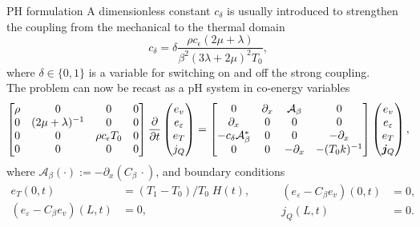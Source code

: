 \documentclass[aspectratio=169]{ISAE-Beamer}
\begin{document}
\begin{frame}{PH formulation}
A dimensionless constant $c_\delta$ is usually introduced to strengthen the coupling from the mechanical to the thermal domain 
\begin{equation*}
c_\delta = \delta \frac{\rho c_\epsilon (2 \mu + \lambda)}{\beta^2 (3 \lambda + 2 \mu)^2 T_0},
\end{equation*}
where $\delta \in \{0, 1\}$ is a variable for switching on and off the strong coupling. \\
 The problem can now be recast as a pH system in co-energy variables
\begin{equation*}
\begin{bmatrix}
{\rho} & {0} & {0} & {0}\\
{0} & (2\mu + \lambda)^{-1} & {0} & {0}\\
0 & 0 & \rho c_\epsilon T_0 & 0\\
{0} & {0} & {0} & {0}\\
\end{bmatrix}
\diffp{}{t}
\begin{pmatrix}
{e}_v \\
{e}_\varepsilon \\
{e}_T \\
{j}_Q \\
\end{pmatrix} = 
\begin{bmatrix}
{0} & \partial_x & \mathcal{A}_\beta & {0}\\
\partial_x & {0} & {0} & {0} \\
- c_\delta \mathcal{A}_\beta^* & 0 & 0 & -\partial_x \\
{0} & {0} & -\partial_x & - (T_0 k)^{-1} \\
\end{bmatrix}
\begin{pmatrix}
{e}_v \\
{e}_\varepsilon \\
{e}_T \\
\bm{j}_Q \\
\end{pmatrix},
\end{equation*}
where $\mathcal{A}_\beta(\cdot):=-\partial_x({C}_\beta \, \cdot)$, and boundary conditions
\begin{equation*}
\begin{aligned}
e_T(0, t) &= (T_1 - T_0)/T_0 \; H(t), \\
(e_\varepsilon - {C}_\beta e_v)(L, t) &= 0,
\end{aligned}  \qquad 
\begin{aligned}
(e_\varepsilon - {C}_\beta e_v)(0, t) &= 0, \\
j_Q(L, t) &= 0.
\end{aligned}
\end{equation*}
\end{frame}
\end{document}
